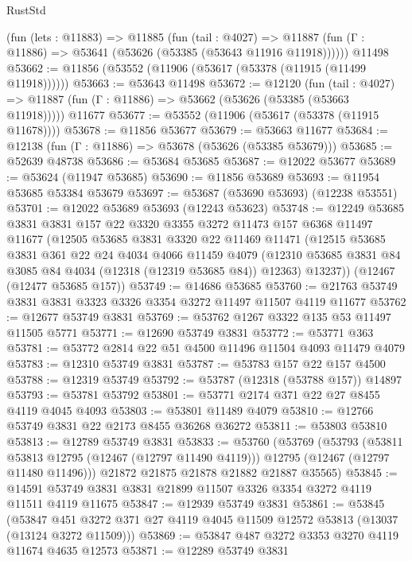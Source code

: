 \begin{lexlean}{RustStd}
\begin{coremodule}
    (fun (lets : @11883) =>
    @11885
      (fun (tail : @4027) =>
      @11887 (fun (Γ : @11886) => @53641 (@53626 (@53385 (@53643 @11916 @11918))))))
    @11498
@53662 := @11856 (@53552 (@11906 (@53617 (@53378 (@11915 (@11499 @11918))))))
@53663 := @53643 @11498
@53672 := @12120
    (fun (tail : @4027) => @11887 (fun (Γ : @11886) => @53662 (@53626 (@53385 (@53663 @11918)))))
    @11677
@53677 := @53552 (@11906 (@53617 (@53378 (@11915 @11678))))
@53678 := @11856 @53677
@53679 := @53663 @11677
@53684 := @12138 (fun (Γ : @11886) => @53678 (@53626 (@53385 @53679)))
@53685 := @52639 @48738
@53686 := @53684 @53685
@53687 := @12022 @53677
@53689 := @53624 (@11947 @53685)
@53690 := @11856 @53689
@53693 := @11954 @53685 @53384 @53679
@53697 := @53687 (@53690 @53693) (@12238 @53551)
@53701 := @12022 @53689 @53693 (@12243 @53623)
@53748 := @12249
    @53685
    @3831
    @3831
    @157
    @22
    @3320
    @3355
    @3272
    @11473
    @157
    @6368
    @11497
    @11677
    (@12505
      @53685
      @3831
      @3320
      @22
      @11469
      @11471
      (@12515
        @53685
        @3831
        @361
        @22
        @24
        @4034
        @4066
        @11459
        @4079
        (@12310 @53685 @3831 @84 @3085 @84 @4034 (@12318 (@12319 @53685 @84)) @12363)
        @13237))
    (@12467 (@12477 @53685 @157))
@53749 := @14686 @53685
@53760 := @21763 @53749 @3831 @3831 @3323 @3326 @3354 @3272 @11497 @11507 @4119 @11677
@53762 := @12677 @53749 @3831
@53769 := @53762 @1267 @3322 @135 @53 @11497 @11505 @5771
@53771 := @12690 @53749 @3831
@53772 := @53771 @363
@53781 := @53772 @2814 @22 @51 @4500 @11496 @11504 @4093 @11479 @4079
@53783 := @12310 @53749 @3831
@53787 := @53783 @157 @22 @157 @4500
@53788 := @12319 @53749
@53792 := @53787 (@12318 (@53788 @157)) @14897
@53793 := @53781 @53792
@53801 := @53771 @2174 @371 @22 @27 @8455 @4119 @4045 @4093
@53803 := @53801 @11489 @4079
@53810 := @12766 @53749 @3831 @22 @2173 @8455 @36268 @36272
@53811 := @53803 @53810
@53813 := @12789 @53749 @3831
@53833 := @53760
    (@53769
      (@53793
        (@53811 @53813 @12795 (@12467 (@12797 @11490 @4119)))
        @12795
        (@12467 (@12797 @11480 @11496)))
      @21872
      @21875
      @21878
      @21882
      @21887
      @35565)
@53845 := @14591 @53749 @3831 @3831 @21899 @11507 @3326 @3354 @3272 @4119 @11511 @4119 @11675
@53847 := @12939 @53749 @3831
@53861 := @53845
    (@53847 @451 @3272 @371 @27 @4119 @4045 @11509 @12572 @53813 (@13037 (@13124 @3272 @11509)))
@53869 := @53847 @487 @3272 @3353 @3270 @4119 @11674 @4635 @12573
@53871 := @12289 @53749 @3831

\end{coremodule}
\end{lexlean}
